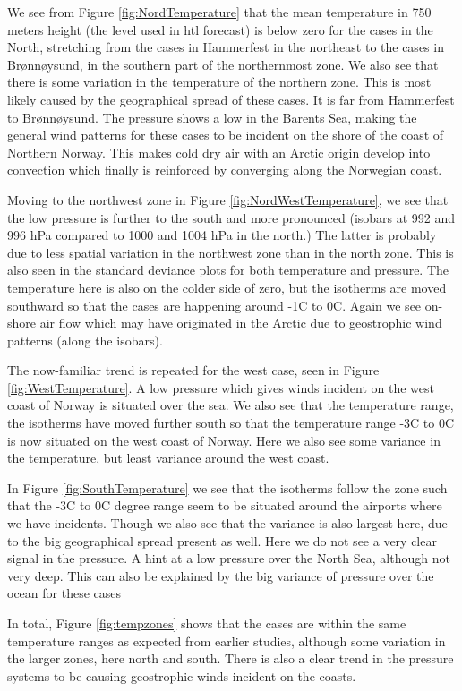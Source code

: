 We see from Figure \ref{fig:NordTemperature} that the mean temperature in 750 meters height (the level used in \acrshort{htl} forecast) is below zero for the cases in the North, stretching from the cases in Hammerfest in the northeast to the cases in Brønnøysund, in the southern part of the northernmost zone. We also see that there is some variation in the temperature of the northern zone. This is most likely caused by the geographical spread of these cases. It is far from Hammerfest to Brønnøysund. The pressure shows a low in the Barents Sea, making the general wind patterns for these cases to be incident on the shore of the coast of Northern Norway. This makes cold dry air with an Arctic origin develop into convection which finally is reinforced by converging along the Norwegian coast. 

Moving to the northwest zone in Figure \ref{fig:NordWestTemperature}, we see that the low pressure is further to the south and more pronounced (isobars at 992 and 996 hPa compared to 1000 and 1004 hPa in the north.) The latter is probably due to less spatial variation in the northwest zone than in the north zone. This is also seen in the standard deviance plots for both temperature and pressure. The temperature here is also on the colder side of zero, but the isotherms are moved southward so that the cases are happening around -1C to 0C. Again we see on-shore air flow which may have originated in the Arctic due to geostrophic wind patterns (along the isobars).

The now-familiar trend is repeated for the west case, seen in Figure \ref{fig:WestTemperature}. A low pressure which gives winds incident on the west coast of Norway is situated over the sea. We also see that the temperature range, the isotherms have moved further south so that the temperature range -3C to 0C is now situated on the west coast of Norway. Here we also see some variance in the temperature, but least variance around the west coast. 

In Figure \ref{fig:SouthTemperature} we see that the isotherms follow the zone such that the -3C to 0C degree range seem to be situated around the airports where we have incidents. Though we also see that the variance is also largest here, due to the big geographical spread present as well. Here we do not see a very clear signal in the pressure. A hint at a low pressure over the North Sea, although not very deep. This can also be explained by the big variance of pressure over the ocean for these cases 

In total, Figure \ref{fig:tempzones} shows that the cases are within the same temperature ranges as expected from earlier studies, although some variation in the larger zones, here north and south. There is also a clear trend in the pressure systems to be causing geostrophic winds incident on the coasts.


